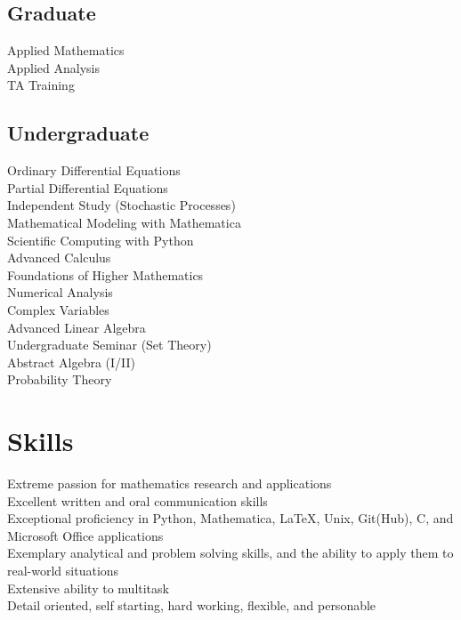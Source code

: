 \documentclass[letterpaper]{deedy-resume} %
\begin{document}
\begin{minipage}[t]{0.33\textwidth}
\subsection{Graduate}

Applied Mathematics \\
Applied Analysis \\
TA Training \\

\sectionspace %


\subsection{Undergraduate}

Ordinary Differential Equations \\
Partial Differential Equations \\
Independent Study (Stochastic Processes) \\
Mathematical Modeling with Mathematica \\
Scientific Computing with Python \\
Advanced Calculus \\
Foundations of Higher Mathematics \\
Numerical Analysis \\
Complex Variables \\
Advanced Linear Algebra \\
Undergraduate Seminar (Set Theory) \\
Abstract Algebra (I/II)\\
Probability Theory \\

\sectionspace %


\section{Skills}
\textbullet{} Extreme passion for mathematics research and applications\\
\textbullet{} Excellent written and oral communication skills\\
\textbullet{} Exceptional proficiency in Python, Mathematica, \LaTeX, Unix, Git(Hub), C, and Microsoft Office applications\\
\textbullet{} Exemplary analytical and problem solving skills, and the ability to apply them to real-world situations\\
\textbullet{} Extensive ability to multitask\\
\textbullet{} Detail oriented, self starting, hard working, flexible, and personable



\end{minipage} %
\end{document}
